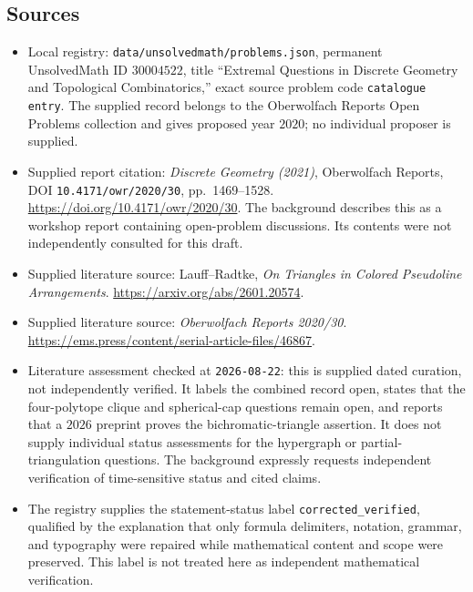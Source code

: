 \documentclass[11pt]{article}
\begin{document}
\subsection{Sources}
\begin{itemize}
\item Local registry: \texttt{data/unsolvedmath/problems.json}, permanent UnsolvedMath ID \(30004522\), title ``Extremal Questions in Discrete Geometry and Topological Combinatorics,'' exact source problem code \texttt{catalogue entry}. The supplied record belongs to the Oberwolfach Reports Open Problems collection and gives proposed year \(2020\); no individual proposer is supplied.
\item Supplied report citation: \emph{Discrete Geometry (2021)}, Oberwolfach Reports, DOI \texttt{10.4171/owr/2020/30}, pp.\ 1469--1528. \url{https://doi.org/10.4171/owr/2020/30}. The background describes this as a workshop report containing open-problem discussions. Its contents were not independently consulted for this draft.
\item Supplied literature source: Lauff--Radtke, \emph{On Triangles in Colored Pseudoline Arrangements}. \url{https://arxiv.org/abs/2601.20574}.
\item Supplied literature source: \emph{Oberwolfach Reports 2020/30}. \url{https://ems.press/content/serial-article-files/46867}.
\item Literature assessment checked at \texttt{2026-08-22}: this is supplied dated curation, not independently verified. It labels the combined record open, states that the four-polytope clique and spherical-cap questions remain open, and reports that a \(2026\) preprint proves the bichromatic-triangle assertion. It does not supply individual status assessments for the hypergraph or partial-triangulation questions. The background expressly requests independent verification of time-sensitive status and cited claims.
\item The registry supplies the statement-status label \texttt{corrected\_verified}, qualified by the explanation that only formula delimiters, notation, grammar, and typography were repaired while mathematical content and scope were preserved. This label is not treated here as independent mathematical verification.
\end{itemize}
\end{document}
